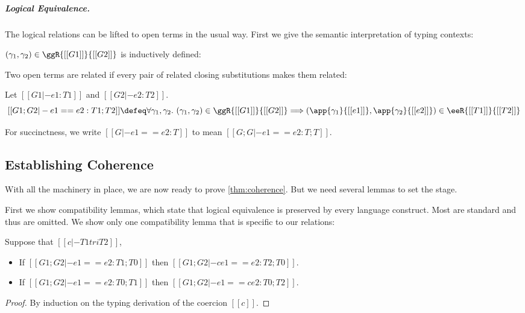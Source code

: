 \subparagraph{Logical Equivalence.}
The logical relations can be lifted to open terms in the usual way. First we give the
semantic interpretation of typing contexts:
\begin{definition}
  $(\gamma_1, \gamma_2) \in \ggR{[[G1]]}{[[G2]]}$ is inductively defined:
\end{definition}
Two open terms are related if every pair of related closing substitutions
makes them related:
\begin{definition}
  Let $[[G1 |- e1 : T1]]$ and $[[G2 |- e2 : T2]]$.
  \[
    [[G1 ; G2 |- e1 == e2 : T1 ; T2]] \defeq \forall \gamma_1, \gamma_2 . \  (\gamma_1, \gamma_2) \in \ggR{[[G1]]}{[[G2]]} \Longrightarrow (\app{\gamma_1}{[[e1]]}, \app{\gamma_2}{[[e2]]}) \in \eeR{[[T1]]}{[[T2]]}
  \]
\end{definition}
For succinctness, we write $[[G |- e1 == e2 : T]]$ to mean $[[G ; G |- e1 == e2 : T ; T]]$.


\subsection{Establishing Coherence}

With all the machinery in place, we are now ready to prove \cref{thm:coherence}. But we need
several lemmas to set the stage.

First we show compatibility lemmas, which state that logical equivalence
is preserved by every language construct. Most are standard and thus are
omitted. We show only one compatibility lemma that is specific to our relations:

\begin{lemma}   \label{lemma:co-compa}
  Suppose that $[[c |- T1 tri T2]]$,
  \begin{itemize}
  \item If $[[G1 ; G2 |- e1 == e2 : T1 ; T0]]$ then $[[G1 ; G2 |- c e1 == e2 : T2 ; T0]]$.
  \item If $[[G1 ; G2 |- e1 == e2 : T0 ; T1]]$ then $[[G1 ; G2 |- e1 == c e2 : T0 ; T2]]$.
  \end{itemize}
\end{lemma}
\begin{proof}
  By induction on the typing derivation of the coercion $[[c]]$.
\end{proof}


